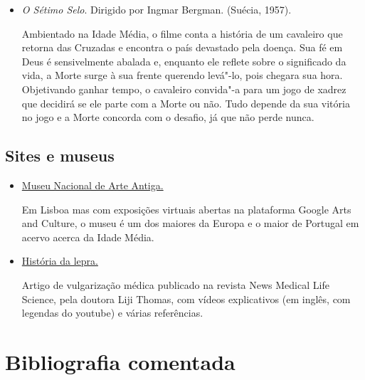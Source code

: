 \documentclass[12pt]{extarticle}
\begin{document}
\begin{itemize}
	Animação dos estúdios Walt Disney, é baseada na história real da indígena do povo Powahtan
	que, sob condições escusas do contexto colonial norte"-americano, se casa com um inglês
	e vai com ele para a Inglaterra. É interessante se observar as diferenças e 
	semelhanças entre o enredo do filme da Disney e o capítulo do livro de Schwob,
	já que ambos partem da mesma história.

	\item\textit{O Sétimo Selo}. Dirigido por Ingmar Bergman. (Suécia, 1957).

	Ambientado na Idade Média, o filme conta a história de um cavaleiro que retorna 
	das Cruzadas e encontra o país devastado pela doença. Sua fé em Deus é sensivelmente 
	abalada e, enquanto ele reflete sobre o significado da vida, a Morte surge à sua 
	frente querendo levá"-lo, pois chegara sua hora. Objetivando ganhar tempo, o cavaleiro 
	convida"-a para um jogo de xadrez que decidirá se ele parte com a Morte ou não. 
	Tudo depende da sua vitória no jogo e a Morte concorda com o desafio, já que não perde nunca.

\end{itemize}

\subsection{Sites e museus}

\begin{itemize}

\item	\href{https://artsandculture.google.com/partner/national-museum-of-ancient-art}{Museu Nacional de Arte Antiga.} 

	Em Lisboa mas com exposições virtuais abertas na plataforma Google Arts and Culture, o museu 
	é um dos maiores da Europa e o maior de Portugal em acervo acerca da Idade Média.  

\item 	\href{https://www.news-medical.net/health/History-of-leprosy-(Portuguese).aspx#:~:text=A%20lepra%20originou%20em%20%C3%81frica,das%20trevas%2C%20at%C3%A9%20aproximadamente%201870.}{História da lepra.}

Artigo de vulgarização médica publicado na revista News 
Medical Life Science, pela doutora Liji Thomas, com 
vídeos explicativos (em inglês, com legendas do youtube) e várias referências. 

\end{itemize}


\section{Bibliografia comentada}
\end{document}
